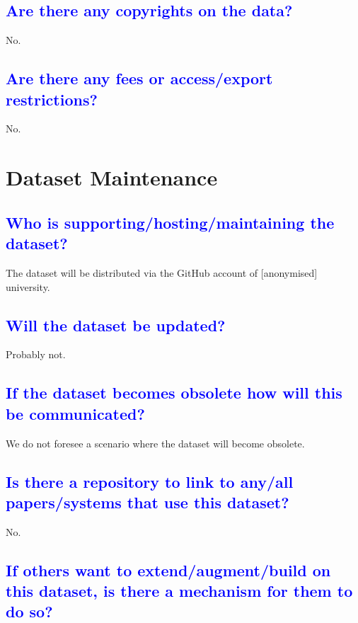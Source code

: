 \documentclass[letterpaper, 10 pt, conference]{ieeeconf}  %
\begin{document}
\textcolor{blue}{\subsection{Are there any copyrights on the data?}}

No.

\textcolor{blue}{\subsection{Are there any fees or access/export restrictions?}}

No.

\bigskip


\section{Dataset Maintenance}

\textcolor{blue}{\subsection{Who is supporting/hosting/maintaining the dataset?}}

The dataset will be distributed via the GitHub account of [anonymised] university.


\textcolor{blue}{\subsection{Will the dataset be updated?}}

Probably not.




\textcolor{blue}{\subsection{If the dataset becomes obsolete how will this be
communicated?}}

We do not foresee a scenario where the dataset will become obsolete.


\textcolor{blue}{\subsection{Is there a repository to link to any/all papers/systems that use this dataset?}}
 
No.


\textcolor{blue}{\subsection{If others want to extend/augment/build on this
dataset, is there a mechanism for them to do so?}}
\end{document}
